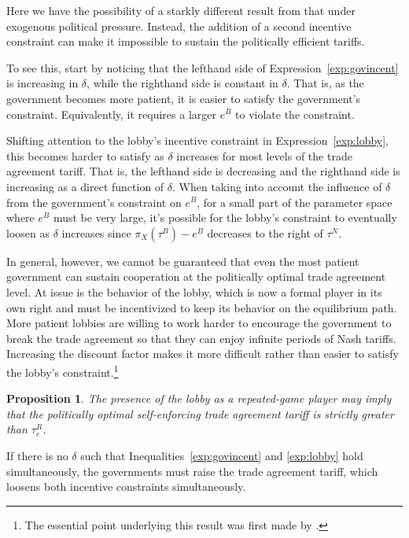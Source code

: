 \documentclass[12pt]{article}
\newtheorem{proposition}{Proposition}
\newcommand{\de}{\delta}
\begin{document}
Here we have the possibility of a starkly different result from that under exogenous political pressure. Instead, the addition of a second incentive constraint can make it impossible to sustain the politically efficient tariffs.

To see this, start by noticing that the lefthand side of Expression~\ref{exp:govincent} is increasing in $\de$, while the righthand side is constant in $\de$. That is, as the government becomes more patient, it is easier to satisfy the government's constraint. Equivalently, it requires a larger $e^B$ to violate the constraint.

Shifting attention to the lobby's incentive constraint in Expression~\ref{exp:lobby}, this becomes harder to satisfy as $\de$ increases for most levels of the trade agreement tariff. That is, the lefthand side is decreasing and the righthand side is increasing as a direct function of $\de$. When taking into account the influence of $\de$ from the government's constraint on $e^B$, for a small part of the parameter space where $e^B$ must be very large, it's possible for the lobby's constraint to eventually loosen as $\de$ increases since $\pi_X(\tau^B) - e^B$ decreases to the right of $\tau^N$.

In general, however, we cannot be guaranteed that even the most patient government can sustain cooperation at the politically optimal trade agreement level. At issue is the behavior of the lobby, which is now a formal player in its own right and must be incentivized to keep its behavior on the equilibrium path. More patient lobbies are willing to work harder to encourage the government to break the trade agreement so that they can enjoy infinite periods of Nash tariffs. Increasing the discount factor makes it more difficult rather than easier to satisfy the lobby's constraint.\footnote{The essential point underlying this result was first made by \Textcite{buzard2013a}.}

\begin{proposition}
  The presence of the lobby as a repeated-game player may imply that the politically optimal self-enforcing trade agreement tariff is strictly greater than $\tau_e^R$.
	\label{res:repeated}
\end{proposition}

If there is no $\de$ such that Inequalities~\ref{exp:govincent} and \ref{exp:lobby} hold simultaneously, the governments must raise the trade agreement tariff, which loosens both incentive constraints simultaneously.
\end{document}
